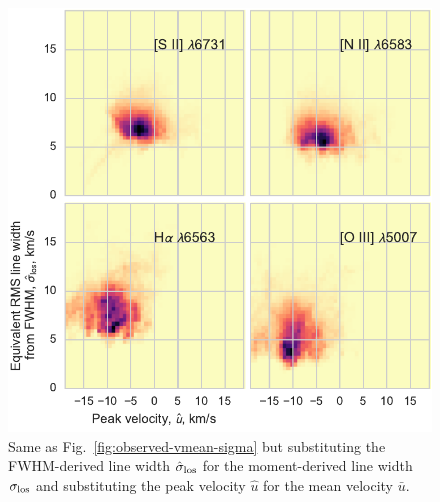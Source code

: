 \documentclass[useAMS,usenatbib]{mn2e}
\begin{document}
\begin{figure}
  \centering
  \includegraphics[width=\linewidth]{obs-combo-hist-vpeak-fwhm.pdf}
  \caption[]{Same as Fig.~\ref{fig:observed-vmean-sigma} but
    substituting the FWHM-derived line width \(\hat{\sigma}_{\mathrm{los}}\) for the
    moment-derived line width \(\sigma_{\mathrm{los}}\) and substituting the peak
    velocity \(\hat{u}\) for the mean velocity \(\bar{u}\).  }
  \label{fig:observed-vmean-sigma-fwhm}
\end{figure}
\end{document}
